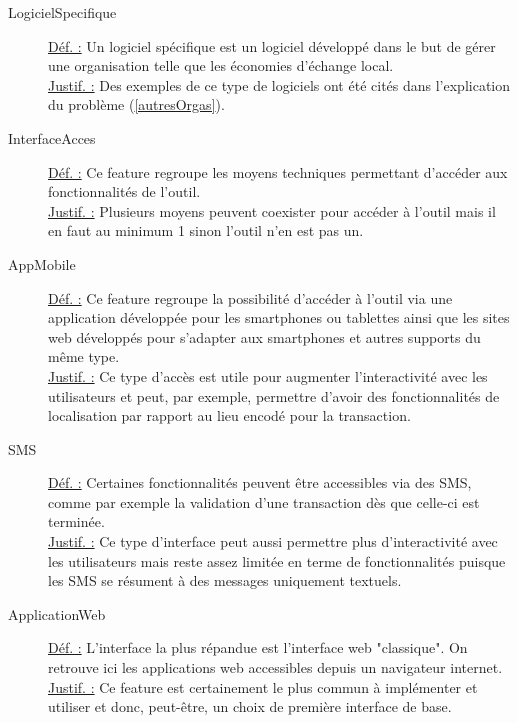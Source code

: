 \begin{description}
\item [LogicielSpecifique]
\underline{Déf. :}  Un logiciel spécifique est un logiciel développé dans le but de gérer une organisation telle que les économies d'échange local.  
\\ \underline{Justif. :}  Des exemples de ce type de logiciels ont été cités dans l'explication du problème (\ref{autresOrgas}).  
\newline

\item [InterfaceAcces]
\underline{Déf. :}  Ce feature regroupe les moyens techniques permettant d'accéder aux fonctionnalités de l'outil.
\\ \underline{Justif. :}  Plusieurs moyens peuvent coexister pour accéder à l'outil mais il en faut au minimum 1 sinon l'outil n'en est pas un.
\newline

\item [AppMobile]
\underline{Déf. :}  Ce feature regroupe la possibilité d'accéder à l'outil via une application développée pour les smartphones ou tablettes ainsi que les sites web développés pour s'adapter aux smartphones et autres supports du même type.  
\\ \underline{Justif. :}   Ce type d'accès est utile pour augmenter l'interactivité avec les utilisateurs et peut,  par exemple,  permettre d'avoir des fonctionnalités de localisation par rapport au lieu encodé pour la transaction.
\newline

\item [SMS]
\underline{Déf. :}  Certaines fonctionnalités peuvent être accessibles via des SMS,  comme par exemple la validation d'une transaction dès que celle-ci est terminée.
\\ \underline{Justif. :}  Ce type d'interface peut aussi permettre plus d'interactivité avec les utilisateurs mais reste assez limitée en terme de fonctionnalités puisque les SMS se résument à des messages uniquement textuels. 
\newline

\item [ApplicationWeb]
\underline{Déf. :}  L'interface la plus répandue est l'interface web "classique".   On retrouve ici les applications web accessibles depuis un navigateur internet.  
\\ \underline{Justif. :}  Ce feature est certainement le plus commun à implémenter et utiliser et donc,  peut-être,  un choix de première interface de base.
\newline


\end{description}
